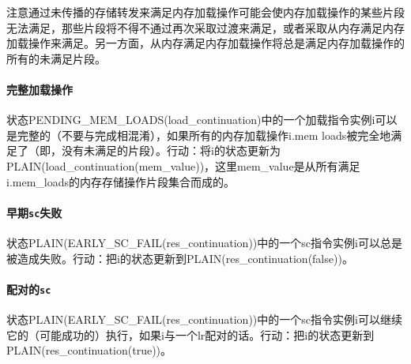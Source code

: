 \begin{commentary}
  注意通过未传播的存储转发来满足内存加载操作可能会使内存加载操作的某些片段无法满足，那些片段将不得不通过再次采取过渡来满足，或者采取从内存满足内存加载操作来满足。另一方面，从内存满足内存加载操作将总是满足内存加载操作的所有的未满足片段。
\end{commentary}


\paragraph{完整加载操作}\label{omm:complete_loads}
状态PENDING_MEM_LOADS(load_continuation)中的一个加载指令实例i可以是完整的（不要与完成相混淆），如果所有的内存加载操作i.mem loads被完全地满足了（即，没有未满足的片段）。行动：将i的状态更新为PLAIN(load_continuation(mem_value))，这里mem_value是从所有满足i.mem_loads的内存存储操作片段集合而成的。


\paragraph{早期{\tt sc}失败}\label{omm:early_sc_fail}
状态PLAIN(EARLY_SC_FAIL(res_continuation))中的一个sc指令实例i可以总是被造成失败。行动：把i的状态更新到PLAIN(res_continuation(false))。


\paragraph{配对的{\tt sc} }\label{omm:paired_sc}
状态PLAIN(EARLY_SC_FAIL(res_continuation))中的一个sc指令实例i可以继续它的（可能成功的）执行，如果i与一个lr配对的话。行动：把i的状态更新到PLAIN(res_continuation(true))。


